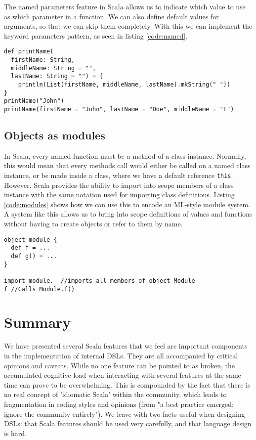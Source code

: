 The named parameters feature in Scala allows us to indicate which value to use as which parameter in a function.
We can also define default values for arguments, so that we can skip them completely.
With this we can implement the keyword parameters pattern, as seen in listing \ref{code:named}.

\begin{lstlisting}[caption=Named parameters \& default arguments, label=code:named]
def printName(
  firstName: String,
  middleName: String = "",
  lastName: String = "") = {
    println(List(firstName, middleName, lastName).mkString(" "))
}
printName("John")
printName(firstName = "John", lastName = "Doe", middleName = "F")
\end{lstlisting}

\subsection{Objects as modules}

In Scala, every named function must be a method of a class instance.
Normally, this would mean that every methods call would either be called on a named class instance, or be made inside a class, where we have a default reference \texttt{this}.
However, Scala provides the ability to import into scope members of a class instance with the same notation used for importing class definitions.
Listing \ref{code:modules} shows how we can use this to encode an ML-style module system.
A system like this allows us to bring into scope definitions of values and functions without having to create objects or refer to them by name.

\begin{lstlisting}[caption=Modules, label=code:modules, float]
object module {
  def f = ...
  def g() = ...
}

import module._ //imports all members of object Module
f //Calls Module.f()
\end{lstlisting}

\section{Summary}

We have presented several Scala features that we feel are important components in the implementation of internal DSLs.
They are all accompanied by critical opinions and caveats.
While no one feature can be pointed to as broken, the accumulated cognitive load when interacting with several features at the same time can prove to be overwhelming.
This is compounded by the fact that there is no real concept of 'idiomatic Scala' within the community, which leads to fragmentation in coding styles and opinions (from \cite{Hale:2011} "a best practice emerged: ignore the community entirely").
We leave with two facts useful when designing DSLs: that Scala features should be used very carefully, and that language design is hard.
